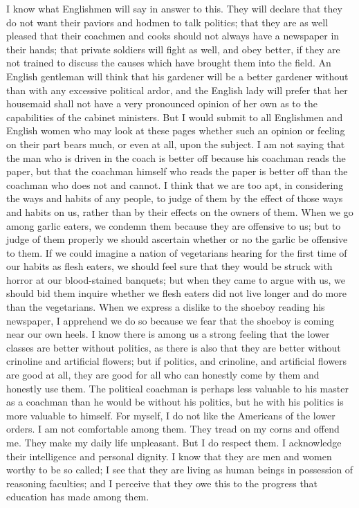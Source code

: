I know what Englishmen will say in answer to this.  They will
declare that they do not want their paviors and hodmen to talk
politics; that they are as well pleased that their coachmen and
cooks should not always have a newspaper in their hands; that
private soldiers will fight as well, and obey better, if they are
not trained to discuss the causes which have brought them into the
field.  An English gentleman will think that his gardener will be a
better gardener without than with any excessive political ardor,
and the English lady will prefer that her housemaid shall not have
a very pronounced opinion of her own as to the capabilities of the
cabinet ministers.  But I would submit to all Englishmen and
English women who may look at these pages whether such an opinion
or feeling on their part bears much, or even at all, upon the
subject.  I am not saying that the man who is driven in the coach
is better off because his coachman reads the paper, but that the
coachman himself who reads the paper is better off than the
coachman who does not and cannot.  I think that we are too apt, in
considering the ways and habits of any people, to judge of them by
the effect of those ways and habits on us, rather than by their
effects on the owners of them.  When we go among garlic eaters, we
condemn them because they are offensive to us; but to judge of them
properly we should ascertain whether or no the garlic be offensive
to them.  If we could imagine a nation of vegetarians hearing for
the first time of our habits as flesh eaters, we should feel sure
that they would be struck with horror at our blood-stained
banquets; but when they came to argue with us, we should bid them
inquire whether we flesh eaters did not live longer and do more
than the vegetarians.  When we express a dislike to the shoeboy
reading his newspaper, I apprehend we do so because we fear that
the shoeboy is coming near our own heels.  I know there is among us
a strong feeling that the lower classes are better without
politics, as there is also that they are better without crinoline
and artificial flowers; but if politics, and crinoline, and
artificial flowers are good at all, they are good for all who can
honestly come by them and honestly use them.  The political
coachman is perhaps less valuable to his master as a coachman than
he would be without his politics, but he with his politics is more
valuable to himself.  For myself, I do not like the Americans of
the lower orders.  I am not comfortable among them.  They tread on
my corns and offend me.  They make my daily life unpleasant.  But I
do respect them.  I acknowledge their intelligence and personal
dignity.  I know that they are men and women worthy to be so
called; I see that they are living as human beings in possession of
reasoning faculties; and I perceive that they owe this to the
progress that education has made among them.

